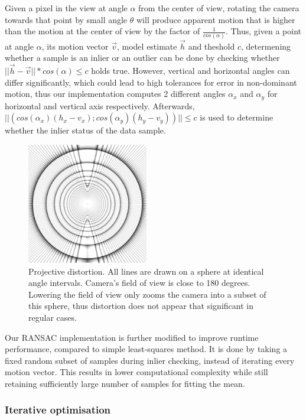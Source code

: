 \documentclass[11pt,english]{report}
\begin{document}
Given a pixel in the view at angle $\alpha$ from the center of view, rotating the camera towards that point by small angle $\theta$ will produce apparent motion that is higher than the motion at the center of view by the factor of $\frac{1}{cos(\alpha)}$. Thus, given a point at angle $\alpha$, its motion vector $\overrightarrow{v}$, model estimate $\overrightarrow{h}$ and theshold $c$, determening whether a sample is an inlier or an outlier can be done by checking whether $||\overrightarrow{h} - \overrightarrow{v}|| * cos(\alpha) \leq c$ holds true. However, vertical and horizontal angles can differ significantly, which could lead to high tolerances for error in non-dominant motion, thus our implementation computes 2 different angles $\alpha_x$ and $\alpha_y$ for horizontal and vertical axis respectively. Afterwards, $||(cos(\alpha_x) (h_x - v_x); cos(\alpha_y) (h_y - v_y))|| \leq c$ is used to determine whether the inlier status of the data sample.

\begin{figure}[!ht]
	\centering
	\includegraphics[width=150pt]{docs/report/distortion.jpg}
	\caption{\centering Projective distortion. All lines are drawn on a sphere at identical angle intervals. Camera's field of view is close to 180 degrees. Lowering the field of view only zooms the camera into a subset of this sphere, thus distortion does not appear that significant in regular cases.}
\end{figure}

Our RANSAC implementation is further modified to improve runtime performance, compared to simple least-squares method. It is done by taking a fixed random subset of samples during inlier checking, instead of iterating every motion vector. This results in lower computational complexity while still retaining sufficiently large number of samples for fitting the mean.

\subsubsection{Iterative optimisation}
\end{document}
